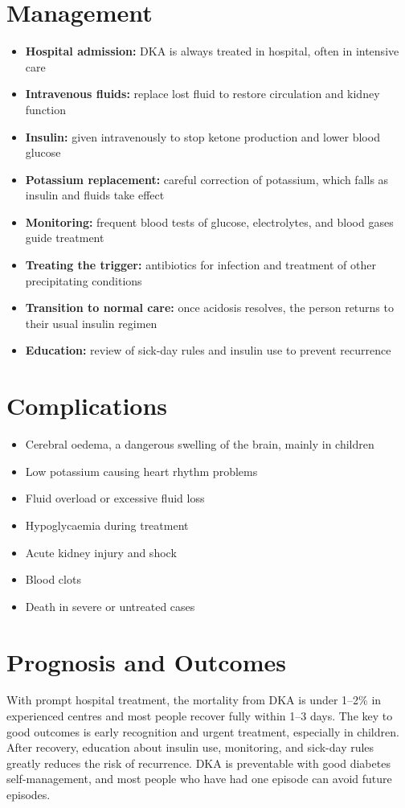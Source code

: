 \section*{Management}
\begin{itemize}
    \item \textbf{Hospital admission:} DKA is always treated in hospital, often in intensive care
    \item \textbf{Intravenous fluids:} replace lost fluid to restore circulation and kidney function
    \item \textbf{Insulin:} given intravenously to stop ketone production and lower blood glucose
    \item \textbf{Potassium replacement:} careful correction of potassium, which falls as insulin and fluids take effect
    \item \textbf{Monitoring:} frequent blood tests of glucose, electrolytes, and blood gases guide treatment
    \item \textbf{Treating the trigger:} antibiotics for infection and treatment of other precipitating conditions
    \item \textbf{Transition to normal care:} once acidosis resolves, the person returns to their usual insulin regimen
    \item \textbf{Education:} review of sick-day rules and insulin use to prevent recurrence
\end{itemize}

\section*{Complications}
\begin{itemize}
    \item Cerebral oedema, a dangerous swelling of the brain, mainly in children
    \item Low potassium causing heart rhythm problems
    \item Fluid overload or excessive fluid loss
    \item Hypoglycaemia during treatment
    \item Acute kidney injury and shock
    \item Blood clots
    \item Death in severe or untreated cases
\end{itemize}

\section*{Prognosis and Outcomes}
With prompt hospital treatment, the mortality from DKA is under 1--2\% in experienced centres and most people recover fully within 1--3 days. The key to good outcomes is early recognition and urgent treatment, especially in children. After recovery, education about insulin use, monitoring, and sick-day rules greatly reduces the risk of recurrence. DKA is preventable with good diabetes self-management, and most people who have had one episode can avoid future episodes.

